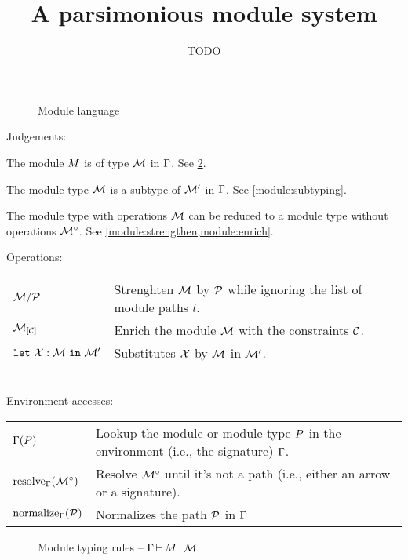 \documentclass{article}
\title{A parsimonious module system}
\author{TODO}
\date{}
\theoremstyle{definition}
\newcommand\TODO[1]{{\textbf{\color{red}{TODO: #1}}}}
\begin{document}
\maketitle

\begin{figure}[!hb]
  
  \caption{Module language}
  \label{grammar}
\end{figure}

Judgements:\\
\begin{description}[align=right, leftmargin=3.5cm]
\item[$\wtm{\E}{\im}{\iM}$ :]
  The module $\im$ is of type $\iM$ in $\E$.
  See \cref{module:typing}.
\item[$\submod{\E}{\iM}{\iM'}{\iM_r}$ :]
  The module type $\iM$ is a subtype of $\iM'$ in $\E$.
  See \cref{module:subtyping}.
\item[$\Oreduce{\E}{\iM} = \iMO$ :]
  The module type with operations $\iM$ can be reduced to a module
  type without operations $\iMO$.
  See \cref{module:strengthen,module:enrich}.
  \TODO{Change bracket style ...}
\end{description}

Operations:\\
\begin{tabular}{ll}
  $\Sstrengthen{l}{\iP}{\iM}$
  & Strenghten $\iM$ by $\iP$ while ignoring the list of module paths $l$.\\
  $\Senrich{\iC}{\iM}$
  & Enrich the module $\iM$ with the constraints $\iC$.\\
  $\Ssubst{\iX : \iM}{\iM'}$
  & Substitutes $\iX$ by $\iM$ in $\iM'$.
\end{tabular}\\

Environment accesses:\\
\begin{tabular}{ll}
  $\lookup{\E}{\ip}$
  & Lookup the module or module type $\ip$ in the environment (i.e., the signature)
    $\E$.\\
  $\resolve{\E}{\iMO}$
  & Resolve $\iMO$ until it's not a path (i.e., either an arrow or a signature).\\
  $\Onormalize{\E}{\iP}$
  & Normalizes the path $\iP$ in $\E$
\end{tabular}

\begin{figure}[tbp]
  \vspace{-3mm}
  \caption{Module typing rules -- $\wtm{\E}{\im}{\iM}$}
  \label{module:typing}
\end{figure}
\end{document}
